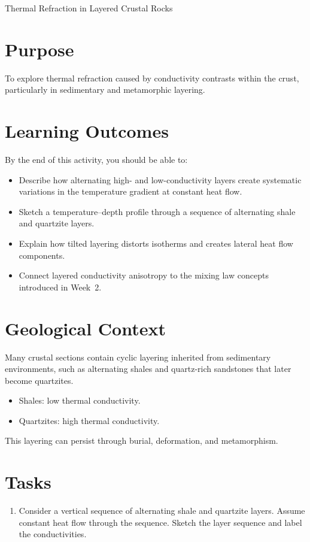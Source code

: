 \begin{activity}{Thermal Refraction in Layered Crustal Rocks}

\section*{Purpose}
To explore thermal refraction caused by conductivity contrasts within the crust, particularly in sedimentary and metamorphic layering.

{\color{red}
\section*{Learning Outcomes}

By the end of this activity, you should be able to:
\begin{itemize}
  \item Describe how alternating high- and low-conductivity layers create systematic variations in the temperature gradient at constant heat flow.
  \item Sketch a temperature--depth profile through a sequence of alternating shale and quartzite layers.
  \item Explain how tilted layering distorts isotherms and creates lateral heat flow components.
  \item Connect layered conductivity anisotropy to the mixing law concepts introduced in Week~2.
\end{itemize}
}

\section*{Geological Context}
Many crustal sections contain cyclic layering inherited from sedimentary environments, such as alternating shales and quartz-rich sandstones that later become quartzites.

\begin{itemize}
  \item Shales: low thermal conductivity.
  \item Quartzites: high thermal conductivity.
\end{itemize}

This layering can persist through burial, deformation, and metamorphism.

\section*{Tasks}
\begin{enumerate}
  \item Consider a vertical sequence of alternating shale and quartzite layers.
  Assume constant heat flow through the sequence. Sketch the layer sequence and label the conductivities.
  \answerbox[3cm]


\end{enumerate}
\end{activity}
